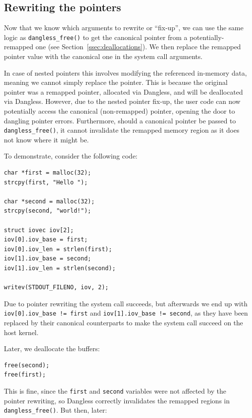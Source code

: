 \subsection{Rewriting the pointers}

Now that we know which arguments to rewrite or ``fix-up'', we can use the same logic as \lstinline!dangless_free()! to get the canonical pointer from a potentially-remapped one (see Section~\ref{ssec:deallocations}). We then replace the remapped pointer value with the canonical one in the system call arguments.

In case of nested pointers this involves modifying the referenced in-memory data, meaning we cannot simply replace the pointer. This is because the original pointer was a remapped pointer, allocated via Dangless, and will be deallocated via Dangless. However, due to the nested pointer fix-up, the user code can now potentially access the canonical (non-remapped) pointer, opening the door to dangling pointer errors. Furthermore, should a canonical pointer be passed to \lstinline!dangless_free()!, it cannot invalidate the remapped memory region as it does not know where it might be.

To demonstrate, consider the following code:

\begin{lstlisting}
char *first = malloc(32);
strcpy(first, "Hello ");

char *second = malloc(32);
strcpy(second, "world!");

struct iovec iov[2];
iov[0].iov_base = first;
iov[0].iov_len = strlen(first);
iov[1].iov_base = second;
iov[1].iov_len = strlen(second);

writev(STDOUT_FILENO, iov, 2);
\end{lstlisting}

Due to pointer rewriting the system call succeeds, but afterwards we end up with \lstinline|iov[0].iov_base != first| and \lstinline|iov[1].iov_base != second|, as they have been replaced by their canonical counterparts to make the system call succeed on the host kernel.

Later, we deallocate the buffers:

\begin{lstlisting}
free(second);
free(first);
\end{lstlisting}

This is fine, since the \lstinline!first! and \lstinline!second! variables were not affected by the pointer rewriting, so Dangless correctly invalidates the remapped regions in \lstinline!dangless_free()!. But then, later:

